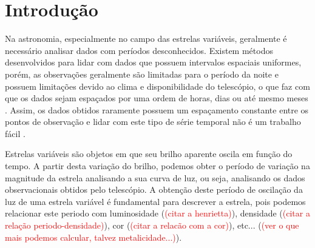 \chapter{Introdu\c{c}ão}


Na astronomia, especialmente no campo das estrelas variáveis, geralmente é necessário analisar dados com períodos desconhecidos. Existem métodos desenvolvidos para lidar com dados que possuem intervalos espaciais uniformes, porém, as observações geralmente são limitadas para o período da noite e possuem limitações devido ao clima e disponibilidade do telescópio, o que faz com que os dados sejam espaçados por uma ordem de horas, dias ou até mesmo meses \citep{mello81}. 
Assim, os dados obtidos raramente possuem um espaçamento constante entre os pontos de observação e lidar com este tipo de série temporal não é um trabalho fácil \citep{lomb}.


Estrelas variáveis são objetos em que seu brilho aparente oscila em função do tempo. A partir desta variação do brilho, podemos obter o período de variação na magnitude da estrela analisando a sua curva de luz, ou seja, analisando os dados observacionais obtidos pelo telescópio. A obtenção deste período de oscilação da luz de uma estrela variável é fundamental para descrever a estrela, pois podemos relacionar este periodo com luminosidade (\textcolor{red}{(citar a henrietta)}), densidade (\textcolor{red}{(citar a relação periodo-densidade)}), cor (\textcolor{red}{(citar a relacão com a cor)}), etc... (\textcolor{red}{(ver o que mais podemos calcular, talvez metalicidade...)}).



